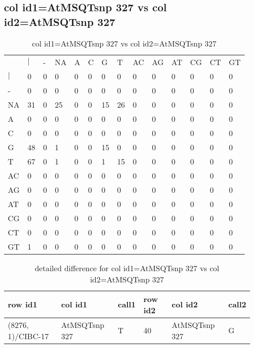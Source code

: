 \subsection{col id1=AtMSQTsnp 327 vs col id2=AtMSQTsnp 327}
\begin{center}
\begin{longtable}{|l|l|l|l|l|l|l|l|l|l|l|l|l|l|}
\caption{col id1=AtMSQTsnp 327 vs col id2=AtMSQTsnp 327} \label{table_dm668}\\
\hline
\\
\hline
&$|$&-&NA&A&C&G&T&AC&AG&AT&CG&CT&GT\\
$|$&0&0&0&0&0&0&0&0&0&0&0&0&0\\
-&0&0&0&0&0&0&0&0&0&0&0&0&0\\
NA&31&0&25&0&0&15&26&0&0&0&0&0&0\\
A&0&0&0&0&0&0&0&0&0&0&0&0&0\\
C&0&0&0&0&0&0&0&0&0&0&0&0&0\\
G&48&0&1&0&0&15&0&0&0&0&0&0&0\\
T&67&0&1&0&0&1&15&0&0&0&0&0&0\\
AC&0&0&0&0&0&0&0&0&0&0&0&0&0\\
AG&0&0&0&0&0&0&0&0&0&0&0&0&0\\
AT&0&0&0&0&0&0&0&0&0&0&0&0&0\\
CG&0&0&0&0&0&0&0&0&0&0&0&0&0\\
CT&0&0&0&0&0&0&0&0&0&0&0&0&0\\
GT&1&0&0&0&0&0&0&0&0&0&0&0&0\\
\hline
\end{longtable}
\end{center}

\begin{center}
\begin{longtable}{|l|l|l|l|l|l|}
\caption{detailed difference for col id1=AtMSQTsnp 327 vs col id2=AtMSQTsnp 327} \label{table_dm669}\\
\hline
row id1&col id1&call1&row id2&col id2&call2\\
\hline
(8276, 1)/CIBC-17&AtMSQTsnp 327&T&40&AtMSQTsnp 327&G\\
\hline
\end{longtable}
\end{center}

